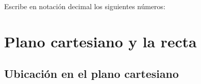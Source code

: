 \documentclass[12pt,addpoints,answers]{evalua}
\begin{document}
\begin{questions}
\begin{multicols}{2}
            \end{multicols}
     
      \question[4] Escribe en notación decimal los siguientes números:
   
      \begin{multicols}{2}
      \end{multicols}

      \newpage
	\section{Plano cartesiano y la recta}

      
	\subsection{Ubicación en el plano cartesiano}


\end{questions}
\end{document}
